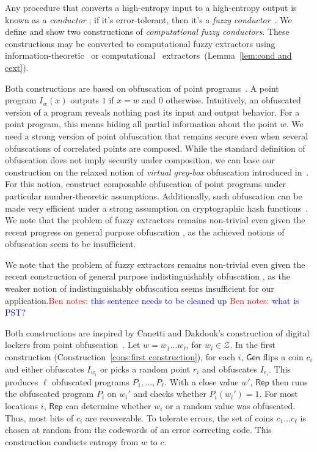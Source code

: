 \documentclass[11pt]{article}
\newcommand{\lemref}[1]{\mbox{Lemma~\ref{#1}}}
\newcommand{\consref}[1]{\mbox{Construction~\ref{#1}}}
\newcommand{\class}[1]{{\ensuremath{\mathsf{#1}}}}
\newcommand{\gen}{\ensuremath{\class{Gen}}\xspace}
\newcommand{\rep}{\ensuremath{\class{Rep}}\xspace}
\newcommand{\authnote}[2]{{\textcolor{red}{\textsf{#1 notes: }\textcolor{blue}{ #2}}\marginpar{\textcolor{red}{\textbf{!!!!!}}}}}
\newcommand{\authnote}[2]{}
\newcommand{\bnote}[1]{{\authnote{Ben}{#1}}}
\begin{document}
Any procedure that converts a high-entropy input to a high-entropy output is known as a \emph{conductor} \cite{CRVW02}; if it's error-tolerant, then it's a \emph{fuzzy conductor}~\cite{KanukurthiR09}. We define and show two constructions of \emph{computational fuzzy conductors}.
These constructions may be converted to computational fuzzy extractors using information-theoretic~\cite{nisan1993randomness} or computational~\cite{krawczyk2010cryptographic} extractors~(\lemref{lem:cond and cext}).

Both constructions are based on  obfuscation of point programs~\cite{canetti1997towards}.  A point program $I_w(x)$ outputs $1$ if $x=w$ and $0$ otherwise.  Intuitively, an obfuscated version of a program reveals nothing past its input and output behavior.  For a point program, this means hiding all partial information about the point $w$.
We need a strong version of point obfuscation that remains secure even when several obfuscations of correlated points are composed. While the standard definition of obfuscation \cite{barak2001possibility} does not imply security under composition, we can base our construction on the relaxed notion of \emph{virtual grey-box} obfuscation introduced in~\cite{bitansky2010strong}. For this notion, \cite{bitansky2010strong} construct composable obfuscation of point programs under particular number-theoretic assumptions. Additionally, such obfuscation can be made very efficient under a strong assumption on cryptographic hash functions~\cite{canetti1997towards}. We note that the problem of fuzzy extractors remains non-trivial even given the recent progress on general purpose obfuscation \cite{GargGH0SW13,BrakerskiR13,BarakGKPS13}, as the achieved notions of obfuscation seem to be insufficient.

We note that the problem of fuzzy extractors remains non-trivial even given the recent construction of general purpose indistinguishably obfuscation \cite{GargGH0SW13,PST13}, as the weaker notion of indistinguishably obfuscation seems insufficient for our application.\bnote{this sentence needs to be cleaned up} \bnote{what is PST?}

Both constructions are inspired by Canetti and Dakdouk's construction of digital lockers from point obfuscation~\cite{canetti2008obfuscating}.  Let $w=w_1 \dots w_\ell$, for $w_i\in \mathcal{Z}$. In the first construction (\consref{cons:first construction}), for each $i$, $\gen$ flips a coin $c_i$ and either obfuscates $I_{w_i}$ or picks a random point $r_i$ and obfuscates $I_{r_i}$.  This produces $\ell$ obfuscated programs $P_1,..., P_\ell$.  With a close value $w'$, $\rep$ then runs the obfuscated program $P_i$ on $w_i'$ and checks whether $P_i(w_i')=1$.  For most locations $i$, \rep can determine whether $w_i$ or a random value was obfuscated.  Thus, most bits of $c_i$ are recoverable. To tolerate errors,  the set of coins $c_1\dots c_\ell$  is chosen at random from the codewords of an error correcting code. This construction conducts entropy from $w$ to $c$.
\end{document}
